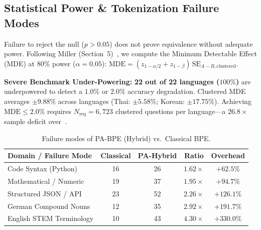 
\subsection{Statistical Power \& Tokenization Failure Modes}
\label{sec:power_and_failures}

Failure to reject the null ($p > 0.05$) does not prove equivalence without adequate power. Following Miller (Section~5)~\cite{miller2024adding}, we compute the Minimum Detectable Effect (MDE) at $80\%$ power ($\alpha=0.05$): $\mathrm{MDE} = (z_{1-\alpha/2} + z_{1-\beta})\,\mathrm{SE}_{A-B,\mathrm{clustered}}$.

\textbf{Severe Benchmark Under-Powering:} \textbf{22 out of 22 languages ($100\%$)} are underpowered to detect a $1.0\%$ or $2.0\%$ accuracy degradation. Clustered MDE averages $\mathbf{\pm 9.88\%}$ across languages (Thai: $\pm 5.58\%$; Korean: $\pm 17.75\%$). Achieving $\mathrm{MDE} \le 2.0\%$ requires $N_{\mathrm{req}} = 6{,}723$ clustered questions per language---a $\mathbf{26.8\times}$ sample deficit over~\cite{foroutan2026parity}.

\begin{table}[t]
\centering
\caption{Failure modes of PA-BPE (Hybrid) vs.\ Classical BPE.}
\vspace{-0.6em}
\footnotesize
\setlength{\tabcolsep}{3.5pt}
\begin{tabular}{lcccc}
\toprule
\textbf{Domain / Failure Mode} & \textbf{Classical} & \textbf{PA-Hybrid} & \textbf{Ratio} & \textbf{Overhead} \\
\midrule
Code Syntax (Python)       & 16 & 26 & $1.62\times$ & $+62.5\%$  \\
Mathematical / Numeric     & 19 & 37 & $1.95\times$ & $+94.7\%$  \\
Structured JSON / API      & 23 & 52 & $2.26\times$ & $+126.1\%$ \\
German Compound Nouns      & 12 & 35 & $2.92\times$ & $+191.7\%$ \\
English STEM Terminology   & 10 & 43 & $4.30\times$ & $+330.0\%$ \\
\bottomrule
\end{tabular}
\vspace{-0.8em}
\label{tab:failure_modes}
\end{table}


